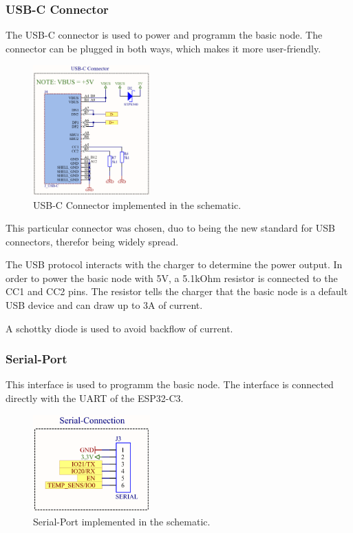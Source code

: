    \subsubsection{USB-C Connector}

        The USB-C connector is used to power and programm the basic node. The connector can
        be plugged in both ways, which makes it more user-friendly.

    \begin{figure}[H]
        \centering
        \includegraphics[width=0.4\textwidth]{assets/HW/USB-C-schematic.png}
        \caption{USB-C Connector implemented in the schematic.}
    \end{figure}

        This particular connector was chosen, duo to being the new standard for USB connectors, 
        therefor being widely spread.

        The USB protocol interacts with the charger to determine the power output. In order to
        power the basic node with 5V, a 5.1kOhm resistor is connected to the CC1 and CC2 pins.
        The resistor tells the charger that the basic node is a default USB device and can draw
        up to 3A of current.\cite{noauthor_fugen_2023}

        A schottky diode is used to avoid backflow of current.

    \subsubsection{Serial-Port}

        This interface is used to programm the basic node. The interface is connected directly
        with the UART of the ESP32-C3. 

    \begin{figure}[H]
        \centering
        \includegraphics[width=0.4\textwidth]{assets/HW/Serial-Port-schematic.png}
        \caption{Serial-Port implemented in the schematic.}
    \end{figure}
    

